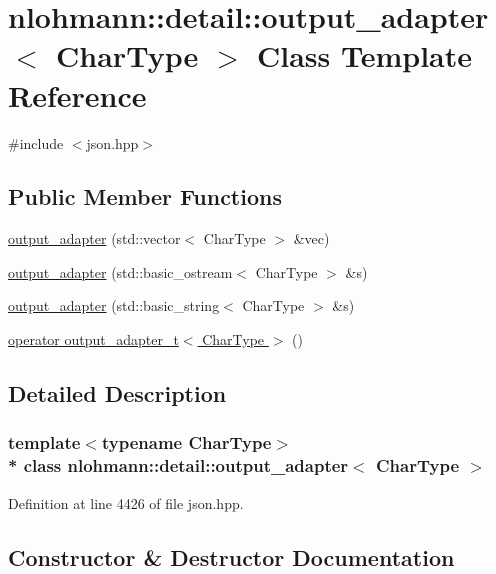 \hypertarget{classnlohmann_1_1detail_1_1output__adapter}{}\section{nlohmann\+:\+:detail\+:\+:output\+\_\+adapter$<$ Char\+Type $>$ Class Template Reference}
\label{classnlohmann_1_1detail_1_1output__adapter}


{\ttfamily \#include $<$json.\+hpp$>$}

\subsection*{Public Member Functions}
\begin{DoxyCompactItemize}
\item 
\hyperlink{classnlohmann_1_1detail_1_1output__adapter_a117bda35bc3de85fd2f5f2153d9705b4}{output\+\_\+adapter} (std\+::vector$<$ Char\+Type $>$ \&vec)
\item 
\hyperlink{classnlohmann_1_1detail_1_1output__adapter_ac086bc101f246eb815e46f17a9e68a4a}{output\+\_\+adapter} (std\+::basic\+\_\+ostream$<$ Char\+Type $>$ \&s)
\item 
\hyperlink{classnlohmann_1_1detail_1_1output__adapter_a07f996a817ffb420022cea56425f7d5c}{output\+\_\+adapter} (std\+::basic\+\_\+string$<$ Char\+Type $>$ \&s)
\item 
\hyperlink{classnlohmann_1_1detail_1_1output__adapter_adee7a0e124f483d9945b8b85c73d7957}{operator output\+\_\+adapter\+\_\+t$<$ Char\+Type $>$} ()
\end{DoxyCompactItemize}


\subsection{Detailed Description}
\subsubsection*{template$<$typename Char\+Type$>$\\*
class nlohmann\+::detail\+::output\+\_\+adapter$<$ Char\+Type $>$}



Definition at line 4426 of file json.\+hpp.



\subsection{Constructor \& Destructor Documentation}
